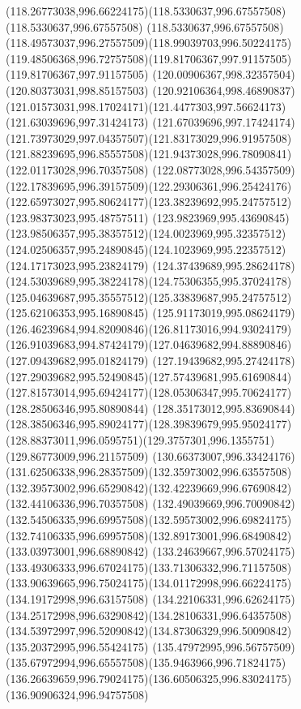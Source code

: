 {{	\curveto(118.26773038,996.66224175)(118.5330637,996.67557508)(118.5330637,996.67557508)
	\curveto(118.5330637,996.67557508)(118.49573037,996.27557509)(118.99039703,996.50224175)
	\curveto(119.48506368,996.72757508)(119.81706367,997.91157505)(119.81706367,997.91157505)
	\lineto(120.00906367,998.32357504)
	\lineto(120.80373031,998.85157503)
	\lineto(120.92106364,998.46890837)
	\curveto(121.01573031,998.17024171)(121.4477303,997.56624173)(121.63039696,997.31424173)
	\curveto(121.67039696,997.17424174)(121.73973029,997.04357507)(121.83173029,996.91957508)
	\curveto(121.88239695,996.85557508)(121.94373028,996.78090841)(122.01173028,996.70357508)
	\curveto(122.08773028,996.54357509)(122.17839695,996.39157509)(122.29306361,996.25424176)
	\curveto(122.65973027,995.80624177)(123.38239692,995.24757512)(123.98373023,995.48757511)
	\curveto(123.9823969,995.43690845)(123.98506357,995.38357512)(124.0023969,995.32357512)
	\curveto(124.02506357,995.24890845)(124.1023969,995.22357512)(124.17173023,995.23824179)
	\curveto(124.37439689,995.28624178)(124.53039689,995.38224178)(124.75306355,995.37024178)
	\curveto(125.04639687,995.35557512)(125.33839687,995.24757512)(125.62106353,995.16890845)
	\curveto(125.91173019,995.08624179)(126.46239684,994.82090846)(126.81173016,994.93024179)
	\curveto(126.91039683,994.87424179)(127.04639682,994.88890846)(127.09439682,995.01824179)
	\curveto(127.19439682,995.27424178)(127.29039682,995.52490845)(127.57439681,995.61690844)
	\curveto(127.81573014,995.69424177)(128.05306347,995.70624177)(128.28506346,995.80890844)
	\curveto(128.35173012,995.83690844)(128.38506346,995.89024177)(128.39839679,995.95024177)
	\curveto(128.88373011,996.0595751)(129.3757301,996.1355751)(129.86773009,996.21157509)
	\curveto(130.66373007,996.33424176)(131.62506338,996.28357509)(132.35973002,996.63557508)
	\curveto(132.39573002,996.65290842)(132.42239669,996.67690842)(132.44106336,996.70357508)
	\curveto(132.49039669,996.70090842)(132.54506335,996.69957508)(132.59573002,996.69824175)
	\curveto(132.74106335,996.69957508)(132.89173001,996.68490842)(133.03973001,996.68890842)
	\curveto(133.24639667,996.57024175)(133.49306333,996.67024175)(133.71306332,996.71157508)
	\curveto(133.90639665,996.75024175)(134.01172998,996.66224175)(134.19172998,996.63157508)
	\curveto(134.22106331,996.62624175)(134.25172998,996.63290842)(134.28106331,996.64357508)
	\curveto(134.53972997,996.52090842)(134.87306329,996.50090842)(135.20372995,996.55424175)
	\curveto(135.47972995,996.56757509)(135.67972994,996.65557508)(135.9463966,996.71824175)
	\curveto(136.26639659,996.79024175)(136.60506325,996.83024175)(136.90906324,996.94757508)
}}
